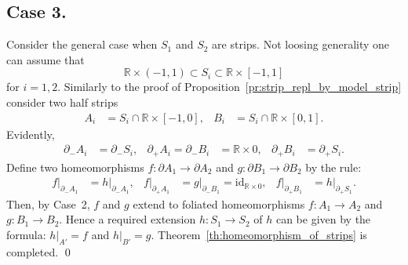 \documentclass[12pt, reqno]{amsart}
\newcommand{\bR}{\mathbb{R}}
\newcommand\dif{h}
\newcommand{\strip}{S}
\newcommand{\id}{\mathrm{id}}
\begin{document}
\subsection*{Case 3.}
Consider the general case when $\strip_1$ and $\strip_2$ are strips.
Not loosing generality one can assume that 
\[
\bR\times(-1,1) \subset \strip_i \subset \bR\times[-1,1]
\]
for $i=1,2$.
Similarly to the proof of Proposition~\ref{pr:strip_repl_by_model_strip} consider two half strips 
\begin{align*}
 A_i &= \strip_i \cap \bR\times[-1,0], & B_i &= \strip_i \cap \bR\times[0,1]. 
\end{align*}
Evidently,
\begin{align*}
\partial_{-} A_i &= \partial_{-} \strip_i,  &
\partial_{+} A_i = \partial_{-} B_i &= \bR\times 0, &
\partial_{+} B_i &= \partial_{+} \strip_i.
\end{align*}
Define two homeomorphisms $f:\partial A_1 \to \partial A_2$  and $g:\partial B_1 \to \partial B_2$ by the rule:
\begin{align*}
f|_{\partial_{-} A_1} &= \dif|_{\partial_{-} A_1}, &
f|_{\partial_{+} A_1} &= g|_{\partial_{-} B_1} = \id_{\bR\times 0}, &
f|_{\partial_{+} B_1} &= \dif|_{\partial_{+} \strip_1}.
\end{align*}
Then, by Case~2, $f$ and $g$ extend to foliated homeomorphisms $f:A_1\to A_2$ and $g:B_1\to B_2$.
Hence a required extension $\dif:\strip_1\to\strip_2$ of $\dif$ can be given by the formula: $\dif|_{A'} = f$ and $\dif|_{B'} = g$.
Theorem~\ref{th:homeomorphism_of_strips} is completed.
\qed
\end{document}
